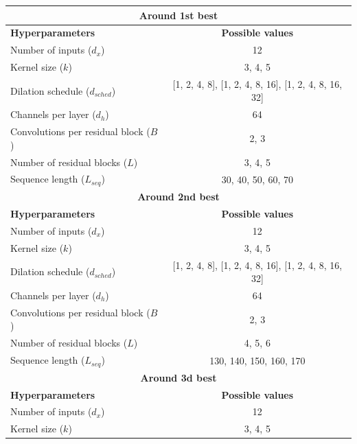 \FloatBarrier
\begin{table}[h]
    \centering
    \begin{tabular}{|l|c|}
        \hline
        \multicolumn{2}{|c|}{\textbf{Around 1st best}} \\
        \hline
        \textbf{Hyperparameters} & \textbf{Possible values} \\
        \hline
        Number of inputs ($d_x$) & 12 \\
        \hline
        Kernel size ($k$) & 3, 4, 5 \\
        \hline
        Dilation schedule ($d_{sched}$) & [1, 2, 4, 8], [1, 2, 4, 8, 16], [1, 2, 4, 8, 16, 32] \\
        \hline
        Channels per layer ($d_h$) & 64 \\
        \hline
        Convolutions per residual block ($B$) & 2, 3 \\
        \hline
        Number of residual blocks ($L$) & 3, 4, 5 \\
        \hline
        Sequence length ($L_{seq}$) & 30, 40, 50, 60, 70 \\
        \hline \hline
        \multicolumn{2}{|c|}{\textbf{Around 2nd best}} \\
        \hline
        \textbf{Hyperparameters} & \textbf{Possible values} \\
        \hline
        Number of inputs ($d_x$) & 12 \\
        \hline
        Kernel size ($k$) & 3, 4, 5 \\
        \hline
        Dilation schedule ($d_{sched}$) & [1, 2, 4, 8], [1, 2, 4, 8, 16], [1, 2, 4, 8, 16, 32] \\
        \hline
        Channels per layer ($d_h$) & 64 \\
        \hline
        Convolutions per residual block ($B$) & 2, 3 \\
        \hline
        Number of residual blocks ($L$) & 4, 5, 6 \\
        \hline
        Sequence length ($L_{seq}$) & 130, 140, 150, 160, 170 \\
        \hline \hline
        \multicolumn{2}{|c|}{\textbf{Around 3d best}} \\
        \hline
        \textbf{Hyperparameters} & \textbf{Possible values} \\
        \hline
        Number of inputs ($d_x$) & 12 \\
        \hline
        Kernel size ($k$) & 3, 4, 5 \\

\end{tabular}
\end{table}
